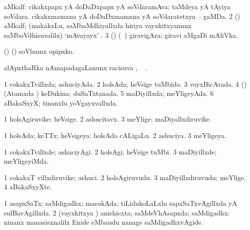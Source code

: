 {\bentry
{} 
\gl{\nA}
\bmng
\bnum
{} aMkalf: 
\banum
{} cikakxpapx yA doDaDxpapx yA soVdaramAva; taMdeya yA tAyiya soVdara. 
 cikakxmamxna yA doDaDxmamxna yA soVdaratetxya -- gaMDa. 
\eanum
\numie
\num{2} (\AmA) aMkalf; (makakxLu, saMbaMdhiyallxda hiriya vayxkitxyanunx saMboVdhisuvalilx) `mAvayayx' . 
\num{3} (\ashi) (\kanmu\ \ca) giravigAra; giravi aMgaDi mAliVka. 
\enum
\emng

\noindent
\gl{\pagu}
\expl{}
\bmng
{} (\ame) (\AmA) soVlnunx opipxko. 
\emng
\eentry

\bentry
{} 
\gl{\uparx}
\expl{}
\bmng
alApxthaRka nAmapadagaLanunx racisuva \uparx, \udA\  
\emng
. \eentry

\bentry
{} 
\gl{\gu}
\expl{}
\bmng
\bnum
\num{1} cokakxTvillxda; ashuciyAda. 
\num{2} holsAda; heVsige tuMbida. 
\num{3} vayxBicArada. 
\num{4} (\beY) (Atamxda \vi) keDukina; duSaTxtanada. 
\num{5} maDiyillxda; meYligeyAda. 
\num{6} aBakaSxyX; tinanxlu yoVgayxvallxda. 
\enum
\emng
\eentry

\bentry
{} 
\gl{\nA}
\expl{}
\bmng
\bnum
\num{1} holsAgiruvike; heVsige. 
\num{2} ashucitavx. 
\num{3} meYlige; maDiyallxdiruvike. 
\enum
\emng
\eentry

\bentry
{} 
\gl{\gu}
\expl{}
\bmng
\bnum
\num{1} holsAda; keTTx; heVsigeya:  holsAda cALigaLu. 
\num{2} ashuciya. 
\num{3} meYligeya. 
\enum
\emng
\eentry

\bentry
{} 
\gl{\kirxvi}
\expl{}
\bmng
\bnum
\num{1} cokakxTvillxde; ashuciyAgi. 
\num{2} holsAgi; heVsige tuMbi. 
\num{3} maDiyillxde; meYligeyiMda. 
\enum
\emng
\eentry

\bentry
{} 
\gl{\nA}
\expl{}
\bmng
\bnum
\num{1} cokakxT villxdiruvike; ashuci. 
\num{2} holsAgiruvudu. 
\num{3} maDiyillxdiruvudu; meYlige. 
\num{4} aBakaSxyXte. 
\enum
\emng
\eentry

\bentry
{} 
\gl{\gu}
\expl{}
\bmng
\bnum
\num{1} asapxSaTx; saMdigadhx; masukAda; tiLidukoLaLxlu sapxSaTxvAgillxda yA sulBavAgillxda. 
\num{2} (vayxkitxya \vi) anishicxta; saMdeVhAsapxda; saMdigadhx:  ninanx manasisxnalilx Enide eMbaudu nanage saMdigadhxvAgide. 
\enum
\emng
\eentry

}
